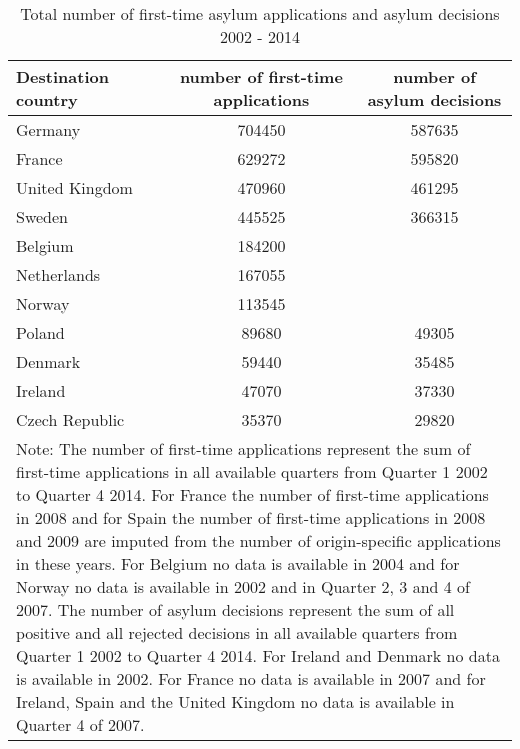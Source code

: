 \begin{table}[!ht]\centering \footnotesize
\caption{Total number of first-time asylum applications and asylum decisions 2002 - 2014}
\begin{tabular}{l*{2}{c}}
\hline\hline
Destination country & number of first-time applications & number of asylum decisions \\
\hline
Germany        	& 704450 	& 587635 \\
[0,5em]
France			& 629272 	& 595820 \\
[0,5em]
United Kingdom 	& 470960 	& 461295 \\
[0,5em]
Sweden 			& 445525 	& 366315 \\
[0,5em]
Belgium        	& 184200 	& 		 \\
[0,5em]
Netherlands		& 167055 	& 		 \\
[0,5em]
Norway        	& 113545 	& 		 \\
[0,5em]
Poland			& 89680 	& 49305	 \\
[0,5em]
Denmark        	& 59440 	& 35485 \\
[0,5em]
Ireland			& 47070 	& 37330 \\	
[0,5em]
Czech Republic	& 35370		& 29820 \\			
\hline\hline
\multicolumn{3}{p{13cm}}{Note: The number of first-time applications represent the sum of  first-time applications in all available quarters from Quarter 1 2002 to Quarter 4 2014. For France the number of first-time applications in 2008 and for  Spain the number of first-time applications in 2008 and 2009 are imputed from the number of origin-specific applications in these years. For Belgium no data is available in 2004 and for Norway no data is available in 2002 and in Quarter 2, 3 and 4 of 2007. The number of asylum decisions represent the sum of all positive and all rejected decisions in all available quarters from Quarter 1 2002 to Quarter 4 2014. For Ireland and Denmark no data is available in 2002. For France no data is available in 2007 and for Ireland, Spain and the United Kingdom no data is available in Quarter 4 of 2007.}
\end{tabular}
\end{table}